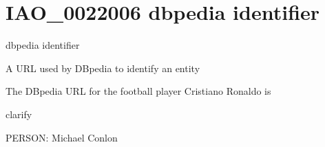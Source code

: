 \documentclass[letterpaper,10pt,english]{sphinxmanual}
\begin{document}
\section{IAO\_0022006 \sphinxhyphen{} dbpedia identifier}
\label{\detokenize{doc-IAO_0022006:iao-0022006-dbpedia-identifier}}\label{\detokenize{doc-IAO_0022006:index-0}}\label{\detokenize{doc-IAO_0022006::doc}}
\begin{sphinxShadowBox}

\sphinxAtStartPar
dbpedia identifier
\end{sphinxShadowBox}

\begin{sphinxShadowBox}

\sphinxAtStartPar
A URL used by DBpedia to identify an entity
\end{sphinxShadowBox}

\begin{sphinxShadowBox}

\sphinxAtStartPar
{}
\end{sphinxShadowBox}

\begin{sphinxShadowBox}

\sphinxAtStartPar
The DBpedia URL for the football player Cristiano Ronaldo is 
\end{sphinxShadowBox}

\begin{sphinxShadowBox}

\sphinxAtStartPar
clarify
\end{sphinxShadowBox}

\begin{sphinxShadowBox}

\sphinxAtStartPar
{}
\end{sphinxShadowBox}

\begin{sphinxShadowBox}

\sphinxAtStartPar
PERSON: Michael Conlon
\end{sphinxShadowBox}
\begin{quote}
\label{\detokenize{doc-IAO_0022010:iao-0022010}}\label{\detokenize{doc-IAO_0022010:global-research-organization-identifier}}\label{\detokenize{doc-IAO_0022010:iao-0022010}}
\ignorespaces \end{quote}
\end{document}
